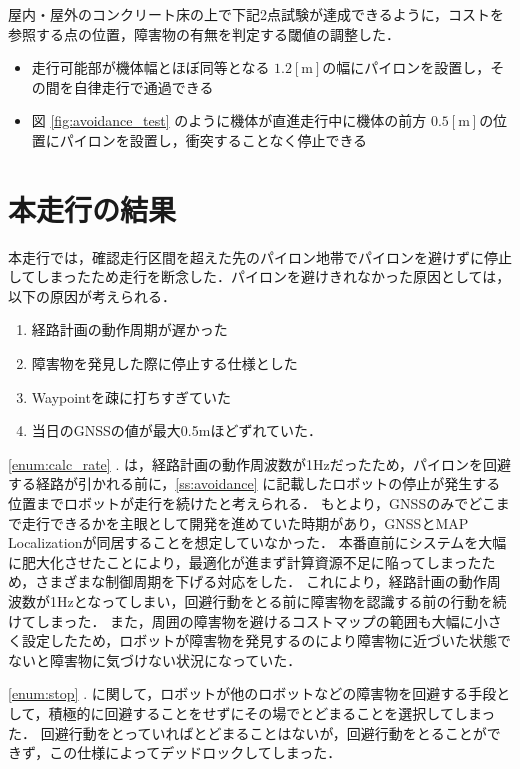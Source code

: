 \documentclass[platex,dvipdfmx]{rbproceedings}
\begin{document}
屋内・屋外のコンクリート床の上で下記2点試験が達成できるように，コストを参照する点の位置，障害物の有無を判定する閾値の調整した．
\begin{itemize}
    \item 走行可能部が機体幅とほぼ同等となる $1.2[\mathrm{m}]$の幅にパイロンを設置し，その間を自律走行で通過できる
    \item 図 \ref{fig:avoidance_test} のように機体が直進走行中に機体の前方  $0.5[\mathrm{m}]$の位置にパイロンを設置し，衝突することなく停止できる
\end{itemize}

\section{本走行の結果}
本走行では，確認走行区間を超えた先のパイロン地帯でパイロンを避けずに停止してしまったため走行を断念した．パイロンを避けきれなかった原因としては，以下の原因が考えられる．

\begin{enumerate}
    \item 経路計画の動作周期が遅かった \label{enum:calc_rate}
    \item 障害物を発見した際に停止する仕様とした \label{enum:stop}
    \item Waypointを疎に打ちすぎていた \label{eunm:waypoint}
    \item 当日のGNSSの値が最大0.5mほどずれていた．\label{eunm:gnss}
\end{enumerate}

\ref{enum:calc_rate} . は，経路計画の動作周波数が1Hzだったため，パイロンを回避する経路が引かれる前に，\ref{ss:avoidance} に記載したロボットの停止が発生する位置までロボットが走行を続けたと考えられる．
もとより，GNSSのみでどこまで走行できるかを主眼として開発を進めていた時期があり，GNSSとMAP Localizationが同居することを想定していなかった．
本番直前にシステムを大幅に肥大化させたことにより，最適化が進まず計算資源不足に陥ってしまったため，さまざまな制御周期を下げる対応をした．
これにより，経路計画の動作周波数が1Hzとなってしまい，回避行動をとる前に障害物を認識する前の行動を続けてしまった．
また，周囲の障害物を避けるコストマップの範囲も大幅に小さく設定したため，ロボットが障害物を発見するのにより障害物に近づいた状態でないと障害物に気づけない状況になっていた．

\ref{enum:stop} . に関して，ロボットが他のロボットなどの障害物を回避する手段として，積極的に回避することをせずにその場でとどまることを選択してしまった．
回避行動をとっていればとどまることはないが，回避行動をとることができず，この仕様によってデッドロックしてしまった．
\end{document}
